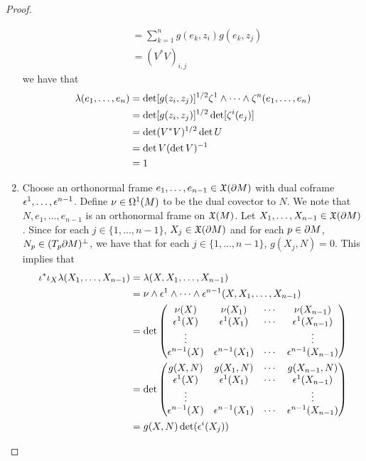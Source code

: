 \documentclass{book}
\begin{document}
\begin{proof}
\begin{enumerate}
\begin{align*}
			& = \sum_{k=1}^n  g(e_k, z_i) g(e_k, z_j) \\
			& = (V^*V)_{i,j}
		\end{align*}
		we have that
		\begin{align*}
			\lambda(e_1, \ldots, e_n)
			& = \det [g(z_i, z_j)]^{1/2} \zeta^1 \wedge \cdots \wedge \zeta^n(e_1, \ldots, e_n) \\
			& = \det [g(z_i, z_j)]^{1/2} \det [\zeta^i(e_j)] \\
			& = \det (V^*V)^{1/2} \det U \\
			& = \det V (\det V)^{-1} \\
			& = 1
		\end{align*}
		\item Choose an orthonormal frame $e_1, \ldots, e_{n-1} \in \mathfrak{X}(\partial M)$ with dual coframe $\epsilon^1, \ldots, \epsilon^{n-1}$. Define $\nu \in \Omega^1(M)$ to be the dual covector to $N$. We note that $N, e_1, \ldots, e_{n-1}$ is an orthonormal frame on $\mathfrak{X}(M)$. Let $X_1, \ldots, X_{n-1} \in \mathfrak{X}(\partial M)$. Since for each $j \in \{1, \ldots, n-1\}$, $X_j \in \mathfrak{X}(\partial M)$ and for each $p \in \partial M$, $N_p \in (T_p \partial M)^{\perp}$, we have that for each $j \in \{1, \ldots, n-1\}$, $g(X_j, N) = 0$. This implies that 
		\begin{align*}
			\iota^* \iota_X \lam (X_1, \ldots, X_{n-1})
			& = \lam(X, X_1, \ldots, X_{n-1}) \\
			& = \nu \wedge \ep^1 \wedge \cdots \wedge \ep^{n-1} (X, X_1, \ldots, X_{n-1})  \\
			& = \det 
			\begin{pmatrix}
				\nu(X)     & \nu(X_1)     & \cdots & \nu(X_{n-1}) \\
				\ep^1(X) & \ep^1(X_1) & \cdots & \ep^1(X_{n-1}) \\ 
				\vdots   &            &        &  \vdots \\
				\ep^{n-1}(X) & \ep^{n-1}(X_1) & \cdots & \ep^{n-1}(X_{n-1})
			\end{pmatrix} \\
			& = \det 
			\begin{pmatrix}
				g(X, N)    & g(X_1, N)     & \cdots & g(X_{n-1}, N) \\
				\ep^1(X)   & \ep^1(X_1)    & \cdots & \ep^1(X_{n-1}) \\ 
				\vdots     &               &        &  \vdots \\
				\ep^{n-1}(X) & \ep^{n-1}(X_1) & \cdots & \ep^{n-1}(X_{n-1})
			\end{pmatrix} \\
			& = g(X, N) \det (\ep^i(X_j)) \\

\end{align*}
\end{enumerate}
\end{proof}
\end{document}

